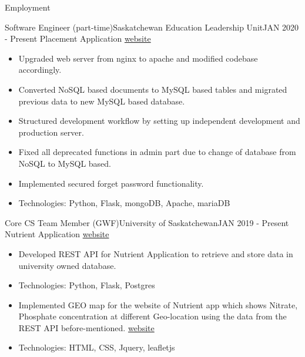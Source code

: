\documentclass[]{mcdowellcv}
\begin{document}
	\begin{cvsection}{Employment}
	
	    \begin{cvsubsection}{Software Engineer (part-time)}{Saskatchewan Education Leadership Unit}{JAN 2020 - Present}
	    Placement Application \href{https://placement.usask.ca}{website}
    	    \begin{itemize}
    	        \item Upgraded web server from nginx to apache and modified codebase accordingly.
    	        \item Converted NoSQL based documents to MySQL based tables and migrated previous data to new MySQL based database.
    	        \item Structured development workflow by setting up independent development and production server.
    	        \item Fixed all deprecated functions in admin part due to change of database from NoSQL to MySQL based.
    	        \item Implemented secured forget password functionality.
    	        \item Technologies: Python, Flask, mongoDB, Apache, mariaDB
    	         
    	        
    	    \end{itemize}
    	
    	\end{cvsubsection}
    	
    		\begin{cvsubsection}{Core CS Team Member (GWF)}{University of Saskatchewan}{JAN 2019 - Present}
    		Nutrient Application \href{https://gwf.usask.ca/projects-facilities/nutrient-app.php#Overview}{ website }
    	    \begin{itemize}
    	        \item Developed REST API for 
    	        Nutrient Application to retrieve and store data in university owned database. 
    	        \item Technologies: Python, Flask, Postgres
    	        \item Implemented GEO map for the website of Nutrient app which shows Nitrate, Phosphate concentration at different Geo-location using the data from the REST API before-mentioned. \href{https://gwf.usask.ca/projects-facilities/nutrient-app.php#ViewYourMeasurements}{website}
    	        \item Technologies: HTML, CSS, Jquery, leafletjs
    	        

\end{itemize}
\end{cvsubsection}
\end{cvsection}
\end{document}
